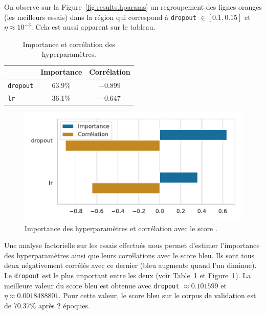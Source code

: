 On observe sur la Figure~\ref{fig.results.hparams} un regroupement des lignes oranges (les meilleurs essais) 
dans la région qui correspond à \verb|dropout| \(\in[0.1, 0.15]\) et \(\eta\approx 10 ^{-3}\).
Cela est aussi apparent sur le tableau.
\begin{table}[hbt]
    \begin{center}
        \begin{tabular}{|l|c|c|}
            \cline{2-3}
            \multicolumn{1}{c|}{} & Importance & Corrélation \\
            \hline
            \verb|dropout|        & 63.9\%     & \(- 0.899\)     \\
            \hline
            \verb|lr|             & 36.1\%     & \(- 0.647\)     \\
            \hline
        \end{tabular}
    \end{center}
    \caption{Importance et corrélation des hyperparamètres.}
    \label{tab.results.hparam.corr}
\end{table}
\begin{figure}[hbt]
    \begin{center}
        \includegraphics[width=.7\textwidth]{assets/python/importance.pdf}
    \end{center}
    \caption{Importance des hyperparamètres et corrélation avec le score .}%
    \label{fig.results.hparam.corr}
\end{figure}
Une analyse factorielle sur les essais effectués nous permet d'estimer l'importance des hyperparamètres 
ainsi que leurs corrélations avec le score \gls{bleu}.
Ils sont tous deux négativement corrélés avec ce dernier (\gls{bleu} augmente quand l'un diminue).
Le \verb|dropout| est le plus important entre les deux 
(voir Table~\ref{tab.results.hparam.corr} et Figure~\ref{fig.results.hparam.corr}).
La meilleure valeur du score \gls{bleu} est obtenue 
avec \verb|dropout| \(\approx 0.101599\) et \(\eta\approx 0.0018488801\).
Pour cette valeur, le score \gls{bleu} sur le corpus de validation est de 70.37\% après 2 époques.